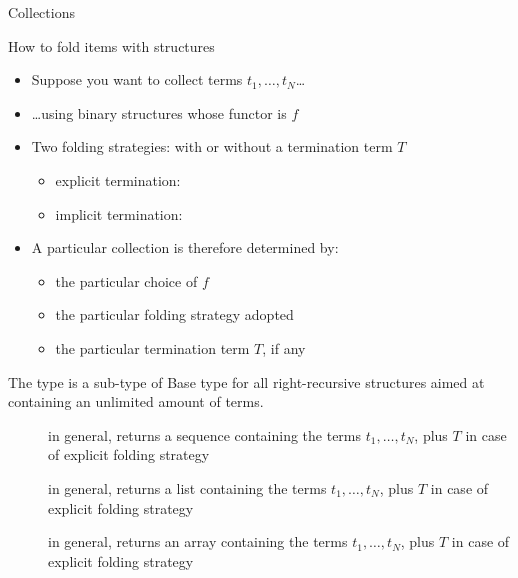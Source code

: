 \documentclass[handout]{beamer}
\begin{document}
\begin{frame}[allowframebreaks]{Collections}
    \begin{exampleblock}{How to fold items with structures}
        \begin{itemize}
            \item Suppose you want to collect terms $t_1, \ldots, t_N$\ldots
            \item \ldots using binary structures whose functor is $f$
            \item Two folding strategies: with or without a termination term $T$
            \begin{itemize}
                \item explicit termination: 
                \item implicit termination: 
            \end{itemize}
            \item A particular collection is therefore determined by:
            \begin{itemize}
                \item the particular choice of $f$
                \item the particular folding strategy adopted
                \item the particular termination term $T$, if any
            \end{itemize}
        \end{itemize}
    \end{exampleblock}
    \begin{block}{The  type is a sub-type of }\centering
        Base type for all right-recursive structures aimed at containing an unlimited amount of terms.
    \end{block}
    \begin{description}
        \item[] in general, returns a sequence containing the terms $t_1, \ldots, t_N$, plus $T$ in case of explicit folding strategy
        \item[] in general, returns a list containing the terms $t_1, \ldots, t_N$, plus $T$ in case of explicit folding strategy
        \item[] in general, returns an array containing the terms $t_1, \ldots, t_N$, plus $T$ in case of explicit folding strategy

\end{description}
\end{frame}
\end{document}
